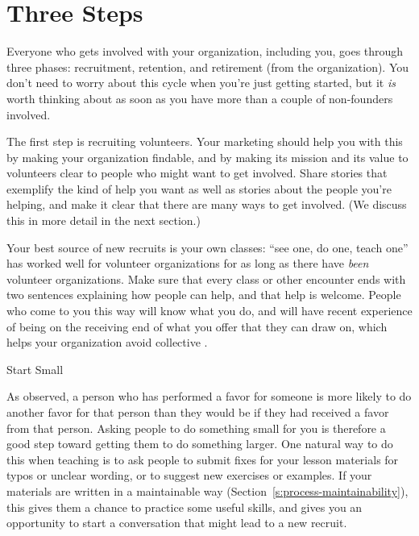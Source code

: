 \section{Three Steps}\label{s:community-three-steps}

Everyone who gets involved with your organization, including you, goes
through three phases: recruitment, retention, and retirement (from the
organization). You don't need to worry about this cycle when you're just
getting started, but it \emph{is} worth thinking about as soon as you have
more than a couple of non-founders involved.

The first step is recruiting volunteers. Your marketing should help you
with this by making your organization findable, and by making its
mission and its value to volunteers clear to people who might want to
get involved. Share stories that exemplify the kind of help you want as
well as stories about the people you're helping, and make it clear that
there are many ways to get involved. (We discuss this in more detail in
the next section.)

Your best source of new recruits is your own classes: ``see one, do one,
teach one'' has worked well for volunteer organizations for as long as
there have \emph{been} volunteer organizations. Make sure that every class or
other encounter ends with two sentences explaining how people can help,
and that help is welcome. People who come to you this way will know what
you do, and will have recent experience of being on the receiving end of
what you offer that they can draw on, which helps your organization
avoid collective .

\begin{aside}{Start Small}

As  observed, a person who has
performed a favor for someone is more likely to do another favor for
that person than they would be if they had received a favor from
that person. Asking people to do something small for you is
therefore a good step toward getting them to do something
larger. One natural way to do this when teaching is to ask people to
submit fixes for your lesson materials for typos or unclear wording,
or to suggest new exercises or examples. If your materials are
written in a maintainable way
(Section~\ref{s:process-maintainability}), this gives them a chance to
practice some useful skills, and gives you an opportunity to start a
conversation that might lead to a new recruit.

\end{aside}

